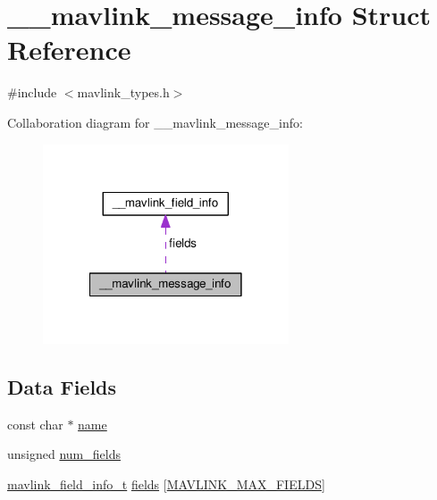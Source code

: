 \hypertarget{struct____mavlink__message__info}{\section{\+\_\+\+\_\+mavlink\+\_\+message\+\_\+info Struct Reference}
\label{struct____mavlink__message__info}
}


{\ttfamily \#include $<$mavlink\+\_\+types.\+h$>$}



Collaboration diagram for \+\_\+\+\_\+mavlink\+\_\+message\+\_\+info\+:\nopagebreak
\begin{figure}[H]
\begin{center}
\leavevmode
\includegraphics[width=206pt]{struct____mavlink__message__info__coll__graph}
\end{center}
\end{figure}
\subsection*{Data Fields}
\begin{DoxyCompactItemize}
\item 
const char $\ast$ \hyperlink{struct____mavlink__message__info_a5e8b48c51cb8bc44bd844d1c3049ee32}{name}
\item 
unsigned \hyperlink{struct____mavlink__message__info_a0c343bcc1f27884e8c2ab875e7efc2e5}{num\+\_\+fields}
\item 
\hyperlink{mavlink__types_8h_a00291ed73cb08731cbcccb8dc974ac95}{mavlink\+\_\+field\+\_\+info\+\_\+t} \hyperlink{struct____mavlink__message__info_a4a15f20958b43cb1282575c6da67a37b}{fields} \mbox{[}\hyperlink{mavlink__types_8h_a27984b8945d505a56168731dc3cac63a}{M\+A\+V\+L\+I\+N\+K\+\_\+\+M\+A\+X\+\_\+\+F\+I\+E\+L\+D\+S}\mbox{]}
\end{DoxyCompactItemize}


